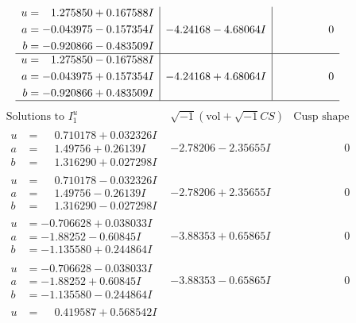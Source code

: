 \documentclass[1p]{elsarticle_modified}
\theoremstyle{definition}
\newcommand{\I}{\sqrt{-1}}
\begin{document}
$$\begin{array}{c|c|c}
\begin{aligned}
u &= \phantom{-}1.275850 + 0.167588 I \\
a &= -0.043975 - 0.157354 I \\
b &= -0.920866 - 0.483509 I\end{aligned}
 & -4.24168 - 4.68064 I & \phantom{-0.000000 } 0 \\ \hline\begin{aligned}
u &= \phantom{-}1.275850 - 0.167588 I \\
a &= -0.043975 + 0.157354 I \\
b &= -0.920866 + 0.483509 I\end{aligned}
 & -4.24168 + 4.68064 I & \phantom{-0.000000 } 0\\
 \hline 
 \end{array}$$\newpage$$\begin{array}{c|c|c}  
\text{Solutions to }I^u_{1}& \I (\text{vol} + \sqrt{-1}CS) & \text{Cusp shape}\\
 \hline 
\begin{aligned}
u &= \phantom{-}0.710178 + 0.032326 I \\
a &= \phantom{-}1.49756 + 0.26139 I \\
b &= \phantom{-}1.316290 + 0.027298 I\end{aligned}
 & -2.78206 - 2.35655 I & \phantom{-0.000000 } 0 \\ \hline\begin{aligned}
u &= \phantom{-}0.710178 - 0.032326 I \\
a &= \phantom{-}1.49756 - 0.26139 I \\
b &= \phantom{-}1.316290 - 0.027298 I\end{aligned}
 & -2.78206 + 2.35655 I & \phantom{-0.000000 } 0 \\ \hline\begin{aligned}
u &= -0.706628 + 0.038033 I \\
a &= -1.88252 - 0.60845 I \\
b &= -1.135580 + 0.244864 I\end{aligned}
 & -3.88353 + 0.65865 I & \phantom{-0.000000 } 0 \\ \hline\begin{aligned}
u &= -0.706628 - 0.038033 I \\
a &= -1.88252 + 0.60845 I \\
b &= -1.135580 - 0.244864 I\end{aligned}
 & -3.88353 - 0.65865 I & \phantom{-0.000000 } 0 \\ \hline\begin{aligned}
u &= \phantom{-}0.419587 + 0.568542 I \\

\end{aligned}
\end{array}$$
\end{document}
